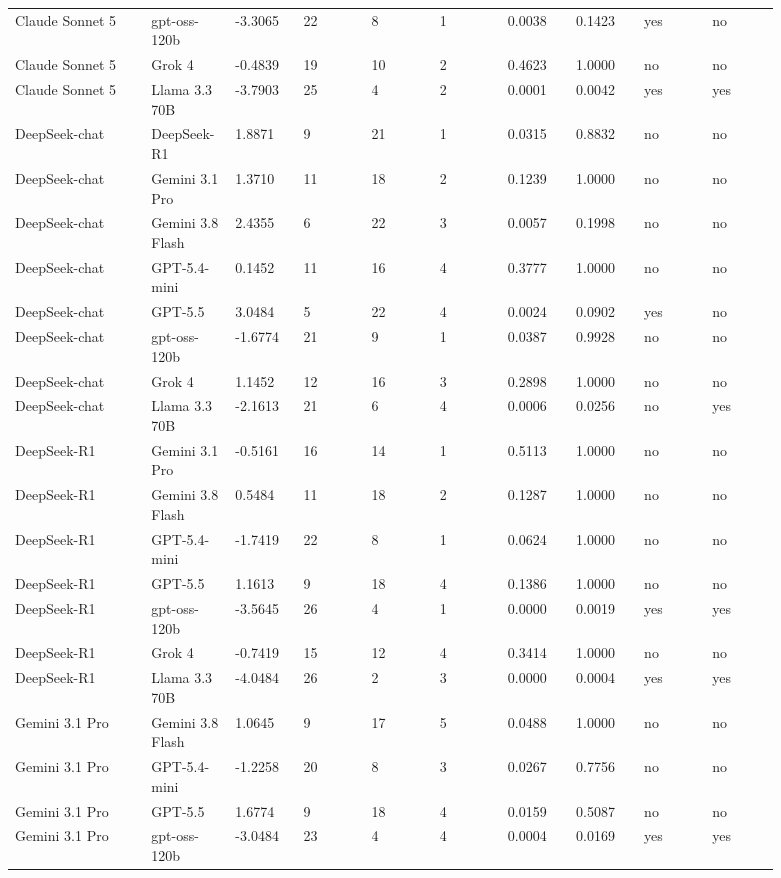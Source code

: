 \begin{landscape}
\begin{longtable}{p{0.162\linewidth}p{0.081\linewidth}p{0.081\linewidth}p{0.081\linewidth}p{0.081\linewidth}p{0.081\linewidth}p{0.081\linewidth}p{0.081\linewidth}p{0.081\linewidth}p{0.081\linewidth}}
Claude Sonnet 5 & gpt-oss-120b & -3.3065 & 22 & 8 & 1 & 0.0038 & 0.1423 & yes & no \\
Claude Sonnet 5 & Grok 4 & -0.4839 & 19 & 10 & 2 & 0.4623 & 1.0000 & no & no \\
Claude Sonnet 5 & Llama 3.3 70B & -3.7903 & 25 & 4 & 2 & 0.0001 & 0.0042 & yes & yes \\
DeepSeek-chat & DeepSeek-R1 & 1.8871 & 9 & 21 & 1 & 0.0315 & 0.8832 & no & no \\
DeepSeek-chat & Gemini 3.1 Pro & 1.3710 & 11 & 18 & 2 & 0.1239 & 1.0000 & no & no \\
DeepSeek-chat & Gemini 3.8 Flash & 2.4355 & 6 & 22 & 3 & 0.0057 & 0.1998 & no & no \\
DeepSeek-chat & GPT-5.4-mini & 0.1452 & 11 & 16 & 4 & 0.3777 & 1.0000 & no & no \\
DeepSeek-chat & GPT-5.5 & 3.0484 & 5 & 22 & 4 & 0.0024 & 0.0902 & yes & no \\
DeepSeek-chat & gpt-oss-120b & -1.6774 & 21 & 9 & 1 & 0.0387 & 0.9928 & no & no \\
DeepSeek-chat & Grok 4 & 1.1452 & 12 & 16 & 3 & 0.2898 & 1.0000 & no & no \\
DeepSeek-chat & Llama 3.3 70B & -2.1613 & 21 & 6 & 4 & 0.0006 & 0.0256 & no & yes \\
DeepSeek-R1 & Gemini 3.1 Pro & -0.5161 & 16 & 14 & 1 & 0.5113 & 1.0000 & no & no \\
DeepSeek-R1 & Gemini 3.8 Flash & 0.5484 & 11 & 18 & 2 & 0.1287 & 1.0000 & no & no \\
DeepSeek-R1 & GPT-5.4-mini & -1.7419 & 22 & 8 & 1 & 0.0624 & 1.0000 & no & no \\
DeepSeek-R1 & GPT-5.5 & 1.1613 & 9 & 18 & 4 & 0.1386 & 1.0000 & no & no \\
DeepSeek-R1 & gpt-oss-120b & -3.5645 & 26 & 4 & 1 & 0.0000 & 0.0019 & yes & yes \\
DeepSeek-R1 & Grok 4 & -0.7419 & 15 & 12 & 4 & 0.3414 & 1.0000 & no & no \\
DeepSeek-R1 & Llama 3.3 70B & -4.0484 & 26 & 2 & 3 & 0.0000 & 0.0004 & yes & yes \\
Gemini 3.1 Pro & Gemini 3.8 Flash & 1.0645 & 9 & 17 & 5 & 0.0488 & 1.0000 & no & no \\
Gemini 3.1 Pro & GPT-5.4-mini & -1.2258 & 20 & 8 & 3 & 0.0267 & 0.7756 & no & no \\
Gemini 3.1 Pro & GPT-5.5 & 1.6774 & 9 & 18 & 4 & 0.0159 & 0.5087 & no & no \\
Gemini 3.1 Pro & gpt-oss-120b & -3.0484 & 23 & 4 & 4 & 0.0004 & 0.0169 & yes & yes \\

\end{longtable}
\end{landscape}
